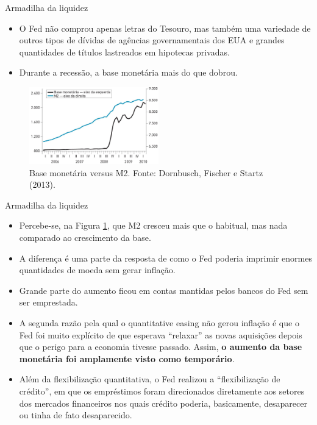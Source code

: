 \documentclass[10pt]{beamer}
\begin{document}
\begin{frame}[t]{Armadilha da liquidez}
\begin{itemize}
    \item O Fed não comprou apenas letras do Tesouro, mas também uma variedade de outros tipos de dívidas de agências governamentais dos EUA e grandes quantidades de títulos lastreados em hipotecas privadas.
    \bigskip
    \item Durante a recessão, a base monetária mais do que dobrou.
\end{itemize}
\bigskip
\begin{figure}
    \centering
    \includegraphics[width=0.5\textwidth]{./figures/aula102_fig5.JPG}
    \caption{Base monetária versus M2. Fonte: Dornbusch, Fischer e Startz (2013).}
    \label{fig5}
\end{figure}
\end{frame}

\begin{frame}{Armadilha da liquidez}
\begin{itemize}
    \item Percebe-se, na Figura \ref{fig5}, que M2 cresceu mais que o habitual, mas nada comparado ao crescimento da base.
    \bigskip
    \item A diferença é uma parte da resposta de como o Fed poderia imprimir enormes quantidades de moeda sem gerar inflação.
    \bigskip
    \item Grande parte do aumento ficou em contas mantidas pelos bancos do Fed sem ser emprestada.
    \bigskip
    \item A segunda razão pela qual o quantitative easing não gerou inflação é que o Fed foi muito explícito de que esperava ``relaxar'' as novas aquisições depois que o perigo para a economia tivesse passado. Assim, \textbf{o aumento da base monetária foi amplamente visto como temporário}.
    \bigskip
    \item Além da flexibilização quantitativa, o Fed realizou a ``flexibilização de crédito'', em que os empréstimos foram direcionados  diretamente aos setores dos mercados financeiros nos quais crédito poderia, basicamente, desaparecer ou tinha de fato desaparecido.
\end{itemize}
\end{frame}
\end{document}
